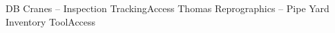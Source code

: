 %
%
%
%
\justifiedsubsection%
{DB Cranes -- Inspection Tracking}{Access}
%
%
%
%
\justifiedsubsection%
{Thomas Reprographics -- Pipe Yard Inventory Tool}{Access}
%
%
%
%